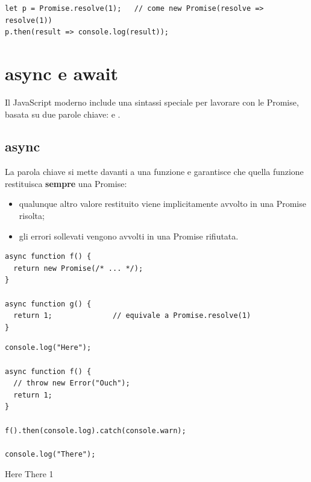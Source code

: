 \begin{lstlisting}[style=js]
let p = Promise.resolve(1);   // come new Promise(resolve => resolve(1))
p.then(result => console.log(result));
\end{lstlisting}

\section{async e await}

Il JavaScript moderno include una sintassi speciale per lavorare con le
Promise, basata su due parole chiave:  e .

\subsection{async}

La parola chiave  si mette davanti a una funzione e garantisce che
quella funzione restituisca \textbf{sempre} una Promise:

\begin{itemize}
  \item qualunque altro valore restituito viene implicitamente avvolto in una
        Promise risolta;
  \item gli errori sollevati vengono avvolti in una Promise rifiutata.
\end{itemize}

\begin{lstlisting}[style=js, name=async.js]
async function f() {
  return new Promise(/* ... */);
}

async function g() {
  return 1;              // equivale a Promise.resolve(1)
}
\end{lstlisting}

\begin{affianco}[0.55][c]
\begin{lstlisting}[style=js, name=async-uso.js]
console.log("Here");

async function f() {
  // throw new Error("Ouch");
  return 1;
}

f().then(console.log).catch(console.warn);

console.log("There");
\end{lstlisting}
\risultato
\begin{immagine}
\end{immagine}
\begin{console}
Here
There
1
\end{console}
\end{affianco}

